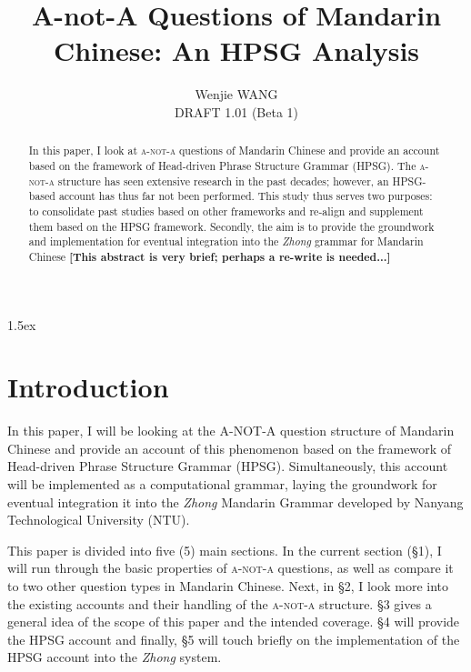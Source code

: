 \documentclass[12pt, UTF8]{article}
\title{A-not-A Questions of Mandarin Chinese: An HPSG Analysis}
\author{Wenjie WANG\\ 
DRAFT 1.01 (Beta 1)}
\begin{document}
\parskip 1.5ex
\maketitle

\tableofcontents

\newpage

\begin{abstract}

In this paper, I look at \textsc{a-not-a} questions of Mandarin Chinese and provide an account based on the framework of Head-driven Phrase Structure Grammar (HPSG). The \textsc{a-not-a} structure has seen extensive research in the past decades; however, an HPSG-based account has thus far not been performed. This study thus serves two purposes: to consolidate past studies based on other frameworks and re-align and supplement them based on the HPSG framework. Secondly, the aim is to provide the groundwork and implementation for eventual integration into the \textit{Zhong }grammar for Mandarin Chinese \textbf{[This abstract is very brief; perhaps a re-write is needed...]}
\end{abstract}

\section{Introduction}
In this paper, I will be looking at the \textsc{A-NOT-A} question structure of Mandarin Chinese and provide an account of this phenomenon based on the framework of Head-driven Phrase Structure Grammar (HPSG). Simultaneously, this account will be implemented as a computational grammar, laying the groundwork for eventual integration it into the \textit{Zhong} Mandarin Grammar developed by Nanyang Technological University (NTU).

This paper is divided into five (5) main sections. In the current section (\S1), I will run through the basic properties of \textsc{a-not-a} questions, as well as compare it to two other question types in Mandarin Chinese. Next, in \S2, I look more into the existing accounts and their handling of the \textsc{a-not-a} structure. \S3 gives a general idea of the scope of this paper and the intended coverage. \S4 will provide the HPSG account and finally, \S5 will touch briefly on the implementation of the HPSG account into the \textit{Zhong} system.
\end{document}
